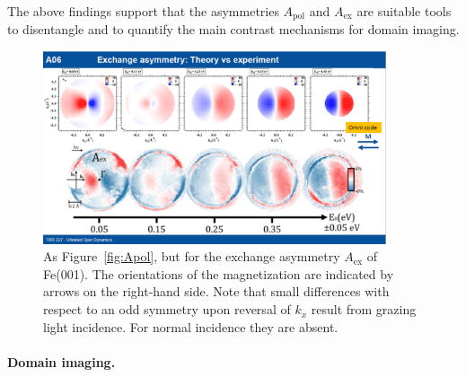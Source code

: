 \documentclass[prl,twocolumn,floatfix]{revtex4-2}
\begin{document}
The above findings support that the asymmetries $A_{\mathrm{pol}}$ and $A_{\mathrm{ex}}$ are suitable tools to disentangle and to quantify the main contrast mechanisms for domain imaging. 
\begin{figure}
    \centering
    \includegraphics[width = 0.9\textwidth]{Aex}
    \caption{As Figure~\ref{fig:Apol}, but for the exchange asymmetry $A_{\mathrm{ex}}$ of Fe(001). The orientations of the magnetization are indicated by arrows on the right-hand side. Note that small differences with respect to an odd symmetry upon reversal of $k_{x}$ result from grazing light incidence. For normal incidence they are absent.}
    \label{fig:Aex}
\end{figure}


\paragraph{Domain imaging.} 
\end{document}
